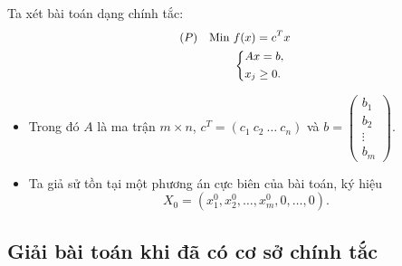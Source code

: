 \documentclass[12pt,a4paper]{report}
\begin{document}
 

Ta xét bài toán dạng chính tắc:
\begin{equation} \small \label{chinhtac}
\begin{split}
(P) \quad \text{Min } & f(x) = c^Tx \\
	& \left\{
	\begin{split}
	& Ax=b, \\
	& x_j \geq 0.
	\end{split}
	\right.    
\end{split}
\end{equation}
\begin{itemize}
\item Trong đó $A$ là ma trận $m\times n$, $c^T=(c_1 \: c_2 \: \ldots \: c_n)$ và $b=\begin{pmatrix}
b_1 \\
b_2 \\
\vdots \\
b_m
\end{pmatrix}$.
\item Ta giả sử tồn tại một phương án cực biên của bài toán, ký hiệu
\begin{equation}
X_0=(x_1^0,x_2^0,\ldots, x_m^0,0,\ldots,0).
\end{equation}

\end{itemize}



\subsection{Giải bài toán khi đã có cơ sở chính tắc}
\end{document}
